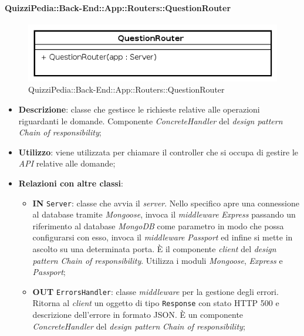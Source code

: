 \paragraph{QuizziPedia::Back-End::App::Routers::QuestionRouter}
\begin{figure}[ht]
	\centering
	\includegraphics[scale=0.8]{UML/Package/QuizziPedia_Back-End_App_Routers_questionRouter.png}
	\caption{QuizziPedia::Back-End::App::Routers::QuestionRouter}
\end{figure}
\FloatBarrier
	\begin{itemize}
		\item \textbf{Descrizione}: classe che gestisce le richieste relative alle operazioni riguardanti le domande. Componente \textit{ConcreteHandler} del \textit{design pattern} \textit{Chain of responsibility};
		\item \textbf{Utilizzo}: viene utilizzata per chiamare il controller che si occupa di gestire le \textit{API} relative alle domande;
		\item \textbf{Relazioni con altre classi}: \\
		\begin{itemize}
			\item \textbf{IN} \texttt{Server}: classe che avvia il \textit{server}. Nello specifico apre una connessione al database tramite \textit{Mongoose}, invoca il \textit{middleware} \textit{Express} passando un riferimento al database \textit{MongoDB} come parametro in modo che possa configurarsi con esso, invoca il \textit{middleware} \textit{Passport} ed infine si mette in ascolto su una determinata porta. È il componente \textit{client} del \textit{design pattern} \textit{Chain of responsibility}. Utilizza i moduli \textit{Mongoose}, \textit{Express} e \textit{Passport};
			\item \textbf{OUT} \texttt{ErrorsHandler}: classe \textit{middleware} per la gestione degli errori. Ritorna al \textit{client} un oggetto di tipo \texttt{Response} con stato HTTP 500 e descrizione dell'errore in formato JSON. È un componente \\\textit{ConcreteHandler} del \textit{design pattern} \textit{Chain of responsibility};

\end{itemize}
\end{itemize}
